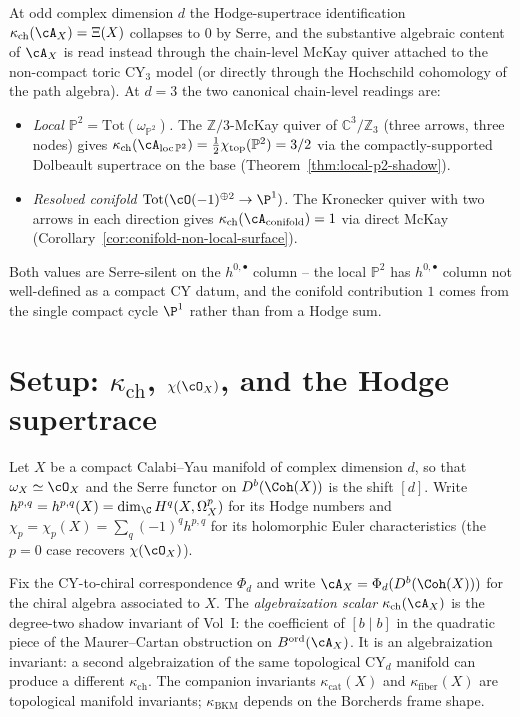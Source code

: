 \begin{remark}
\label{rem:cy-d-kappa-ch-odd-d-chain-level}
At odd complex dimension $d$ the Hodge-supertrace identification
$\kappa_{\mathrm{ch}}(\cA_X) = \Xi(X)$ collapses to $0$ by Serre,
and the substantive algebraic content of $\cA_X$ is read instead
through the chain-level McKay quiver attached to the non-compact
toric CY$_3$ model (or directly through the Hochschild cohomology of
the path algebra). At $d = 3$ the two canonical chain-level readings
are:
\begin{itemize}
\item \emph{Local $\mathbb{P}^2 = \mathrm{Tot}(\omega_{\mathbb{P}^2})$.}
The $\mathbb{Z}/3$-McKay quiver of $\mathbb{C}^3 / \mathbb{Z}_3$
(three arrows, three nodes) gives $\kappa_{\mathrm{ch}}
(\cA_{\mathrm{loc}\,\mathbb{P}^2}) = \tfrac{1}{2}
\chi_{\mathrm{top}}(\mathbb{P}^2) = 3/2$ via the compactly-supported
Dolbeault supertrace on the base (Theorem~\ref{thm:local-p2-shadow}).
\item \emph{Resolved conifold $\mathrm{Tot}(\cO(-1)^{\oplus 2} \to \P^1)$.}
The Kronecker quiver with two arrows in each direction gives
$\kappa_{\mathrm{ch}}(\cA_{\mathrm{conifold}}) = 1$ via direct McKay
(Corollary~\ref{cor:conifold-non-local-surface}).
\end{itemize}
Both values are Serre-silent on the $h^{0, \bullet}$ column --
the local $\mathbb{P}^2$ has $h^{0, \bullet}$ column not well-defined
as a compact CY datum, and the conifold contribution $1$ comes from
the single compact cycle $\P^1$ rather than from a Hodge sum.
\end{remark}

\section{Setup: \texorpdfstring{$\kappa_{\mathrm{ch}}$}{kappa-ch}, \texorpdfstring{$\chi(\cO_X)$}{chi(O-X)}, and the Hodge
supertrace}
\label{sec:cy-strat-setup}

Let $X$ be a compact Calabi--Yau manifold of complex dimension $d$, so
that $\omega_X \simeq \cO_X$ and the Serre functor on $D^b(\Coh(X))$ is
the shift $[d]$. Write $h^{p,q} = h^{p,q}(X) = \dim_\C H^q(X, \Omega^p_X)$
for its Hodge numbers and $\chi_p = \chi_p(X) = \sum_q (-1)^q h^{p,q}$
for its holomorphic Euler characteristics (the $p = 0$ case recovers
$\chi(\cO_X)$).

Fix the CY-to-chiral correspondence $\Phi_d$ and write $\cA_X =
\Phi_d(D^b(\Coh(X)))$ for the chiral algebra associated to $X$. The
\emph{algebraization scalar} $\kappa_{\mathrm{ch}}(\cA_X)$ is the
degree-two shadow invariant of Vol~I: the coefficient of $[b \mid b]$
in the quadratic piece of the Maurer--Cartan obstruction on
$B^{\mathrm{ord}}(\cA_X)$. It is an algebraization invariant: a second
algebraization of the same topological CY$_d$ manifold can produce a
different $\kappa_{\mathrm{ch}}$. The companion invariants
$\kappa_{\mathrm{cat}}(X)$ and $\kappa_{\mathrm{fiber}}(X)$ are
topological manifold invariants; $\kappa_{\mathrm{BKM}}$ depends on
the Borcherds frame shape.

